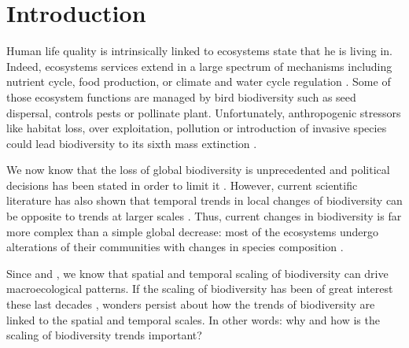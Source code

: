 \documentclass[
  12pt,
  oneside]{report}
\author{François Leroy, PhD student at CZU}
\date{2021-09-22}
\begin{document}


\cleardoublepage 
{}

{
\hypersetup{linkcolor=}
\setcounter{tocdepth}{1}
\tableofcontents
\newpage
}
\vspace{50mm}


\cleardoublepage 
{}


\hypertarget{introduction}{%
\chapter{Introduction}\label{introduction}}

Human life quality is intrinsically linked to ecosystems state that he is living in. Indeed, ecosystems services extend in a large spectrum of mechanisms including nutrient cycle, food production, or climate and water cycle regulation \autocite{pereira_global_2012}. Some of those ecosystem functions are managed by bird biodiversity such as seed dispersal, controls pests or pollinate plant. Unfortunately, anthropogenic stressors like habitat loss, over exploitation, pollution or introduction of invasive species could lead biodiversity to its sixth mass extinction \autocite{barnosky_has_2011}.

We now know that the loss of global biodiversity is unprecedented and political decisions has been stated in order to limit it \autocite[\emph{e.g.}][2010, 2002]{secretariat_of_the_convention_on_biological_diversity_global_2006}. However, current scientific literature has also shown that temporal trends in local changes of biodiversity can be opposite to trends at larger scales \autocite[\emph{e.g.}][]{chase_species_2019}. Thus, current changes in biodiversity is far more complex than a simple global decrease: most of the ecosystems undergo alterations of their communities with changes in species composition \autocite{blowes_geography_2019,dornelas_quantifying_2013,vaidyanathan_worlds_2021}.

Since \textcite{arrhenius_species_1921} and \textcite{grinnell_role_1922}, we know that spatial and temporal scaling of biodiversity can drive macroecological patterns. If the scaling of biodiversity has been of great interest these last decades \autocite[\emph{e.g.}][]{storch_scaling_2007}, wonders persist about how the trends of biodiversity are linked to the spatial and temporal scales. In other words: why and how is the scaling of biodiversity trends important?
\end{document}
